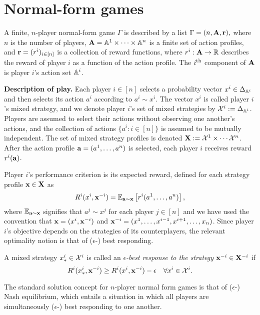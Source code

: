 \section{Normal-form games}  \label{sec:model}

A finite, $n$-player normal-form game $\Gamma$ is described by a list  $\Gamma = ( n, \bA, \br ), $ where $n$ is the number of players, $\bA = \aa^1 \times \cdots \times \aa^n$ is a finite set of action profiles, and $\br = ( r^i)_{i \in [n]}$ is a collection of reward functions, where $r^i : \bA \to \rr$ describes the reward of player $i$ as a function of the action profile. The $i^{\rm th}$ component of $\bA$ is player $i$'s action set $\aa^i$. 

\noindent \textbf{Description of play.} Each player $i \in [n]$ selects a probability vector $x^i \in \Delta_{\aa^i}$ and then selects its action $a^i$ according to $a^i \sim x^i$. The vector $x^i$ is called player $i$'s mixed strategy, and we denote player $i$'s set of mixed strategies by $\XX^i := \simplex_{\aa^i}$. Players are assumed to select their actions without observing one another's actions, and the collection of actions $\{ a^i : i \in [n]\}$ is assumed to be mutually independent. The set of mixed strategy profiles is denoted $\bX := \XX^1 \times \cdots \XX^n$. After the action profile $\ba = ( a^1, \dots, a^n)$ is selected, each player $i$ receives reward $r^i (  \ba  )$. 

Player $i$'s performance criterion is its expected reward, defined for each strategy profile $\bx \in \bX$ as
\[
R^i ( x^i, \bx^{-i} ) = \ee_{\ba\sim \bx} \left[ r^i ( a^1, \dots, a^n ) \right],
\]
where $\ee_{\ba \sim \bx}$ signifies that $a^j \sim x^j$ for each player $j \in [n]$ and we have used the convention that $\bx = (x^i, \bx^{-i})$ and $\bx^{-i} = ( x^1, \dots, x^{i-1}, x^{i+1}, \dots, x_n )$. Since player $i$'s objective depends on the strategies of its counterplayers, the relevant optimality notion is that of ($\epsilon$-) best responding.

\begin{definition}
    A mixed strategy $x^{i}_{*} \in \XX^i$ is called an \emph{$\epsilon$-best response to the strategy $\bx^{-i} \in \bX^{-i}$} if
        \[
            R^i ( x^{i}_{*}, \bx^{-i} ) \geq R^i ( x^i, \bx^{-i} ) - \epsilon \quad \forall x^i \in \XX^i . 
        \]
\end{definition}

The standard solution concept for $n$-player normal form games is that of ($\epsilon$-) Nash equilibrium, which entails a situation in which all players are simultaneously ($\epsilon$-) best responding to one another. 

